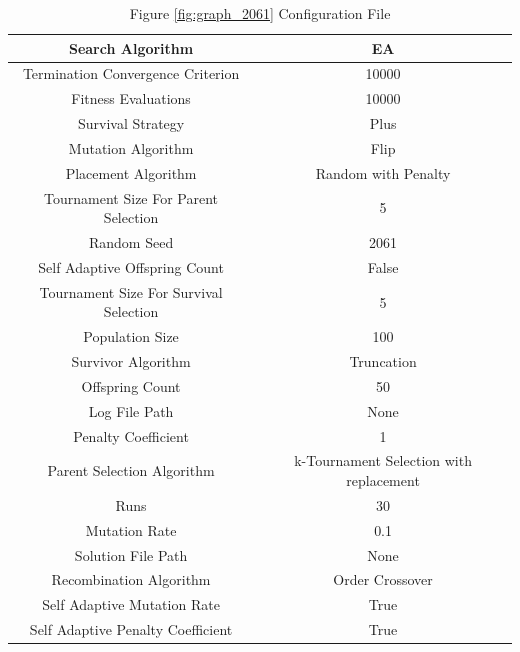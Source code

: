 \documentclass{standalone}
\begin{document}
\clearpage
\begin{table}[!htb]
	\centering
	\caption{Figure \ref{fig:graph_2061} Configuration File}
	\label{tab:graph_2061}
	\begin{tabular}{| c | c |}
		\hline
		Search Algorithm		& EA		 \\
		\hline
		Termination Convergence Criterion		& 10000		 \\
		\hline
		Fitness Evaluations		& 10000		 \\
		\hline
		Survival Strategy		& Plus		 \\
		\hline
		Mutation Algorithm		& Flip		 \\
		\hline
		Placement Algorithm		& Random with Penalty		 \\
		\hline
		Tournament Size For Parent Selection		& 5		 \\
		\hline
		Random Seed		& 2061		 \\
		\hline
		Self Adaptive Offspring Count		& False		 \\
		\hline
		Tournament Size For Survival Selection		& 5		 \\
		\hline
		Population Size		& 100		 \\
		\hline
		Survivor Algorithm		& Truncation		 \\
		\hline
		Offspring Count		& 50		 \\
		\hline
		Log File Path		& None		 \\
		\hline
		Penalty Coefficient		& 1		 \\
		\hline
		Parent Selection Algorithm		& k-Tournament Selection with replacement		 \\
		\hline
		Runs		& 30		 \\
		\hline
		Mutation Rate		& 0.1		 \\
		\hline
		Solution File Path		& None		 \\
		\hline
		Recombination Algorithm		& Order Crossover		 \\
		\hline
		Self Adaptive Mutation Rate		& True		 \\
		\hline
		Self Adaptive Penalty Coefficient		& True		 \\
		\hline
	\end{tabular}
\end{table}
\end{document}
